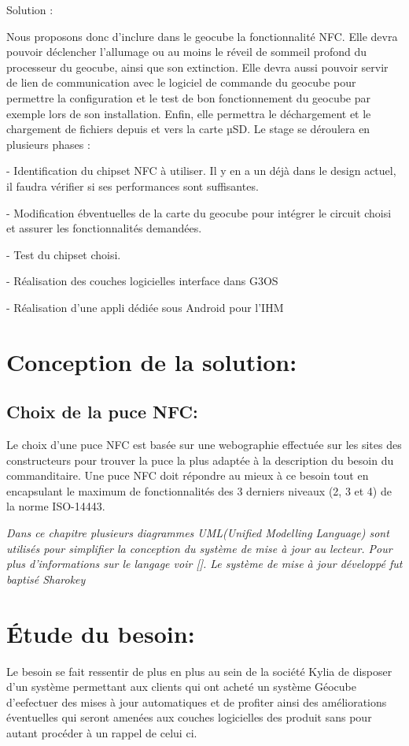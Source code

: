 \documentclass{themeensg}
\begin{document}
Solution :

Nous proposons donc d’inclure dans le geocube la fonctionnalité NFC. Elle devra pouvoir déclencher l’allumage ou au moins le réveil de sommeil profond du processeur du geocube, ainsi que son extinction. Elle devra aussi pouvoir servir de lien de communication avec le logiciel de commande du geocube pour permettre la configuration et le test de bon fonctionnement du geocube par exemple lors de son installation. Enfin, elle permettra le déchargement et le chargement de fichiers depuis et vers la carte µSD.
Le stage se déroulera en plusieurs phases :

-          Identification du chipset NFC à utiliser. Il y en a un déjà dans le design actuel, il faudra vérifier si ses performances sont suffisantes.

-          Modification ébventuelles de la carte du geocube pour intégrer le circuit choisi et assurer les fonctionnalités demandées.

-          Test du chipset choisi.

-          Réalisation des couches logicielles interface dans G3OS

-          Réalisation d’une appli dédiée sous Android pour l’IHM

\section{Conception de la solution:}
\subsection{Choix de la puce NFC:}
Le choix d'une puce NFC est basée sur une webographie effectuée sur les sites des constructeurs pour trouver la puce la plus adaptée à la description du besoin du commanditaire. Une puce NFC doit répondre au mieux à ce besoin tout en encapsulant le maximum de fonctionnalités des 3 derniers niveaux (2, 3 et 4) de la norme ISO-14443.
  

\textit{ Dans ce chapitre plusieurs diagrammes UML(Unified Modelling Language) sont utilisés pour simplifier la conception du système de mise à jour au lecteur. Pour plus d'informations sur le langage voir []. Le système de mise à jour développé fut baptisé Sharokey}
\section{Étude du besoin:}
Le besoin se fait ressentir de plus en plus au sein de la société Kylia de disposer d'un système permettant aux clients qui ont acheté un système Géocube  d'eefectuer des mises à jour automatiques et de profiter ainsi des améliorations éventuelles qui seront amenées aux couches logicielles des produit sans pour autant procéder à un rappel de celui ci.
\end{document}
